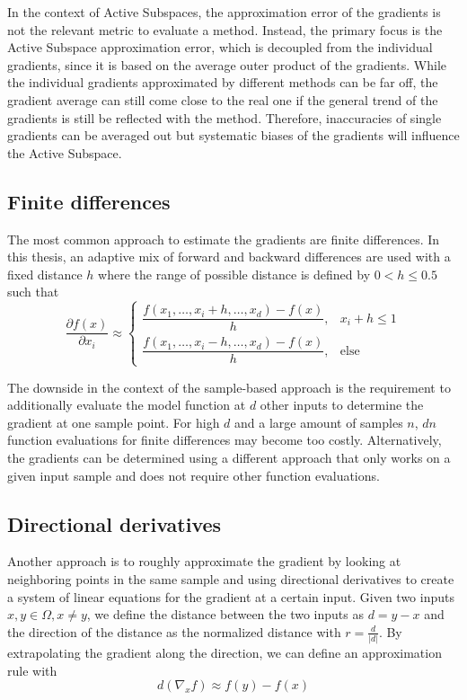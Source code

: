 \documentclass[
  a4paper,  %
  twoside,  %
  bibliography=totoc,
  headsepline,
  cleardoublepage=empty,
  parskip=half,
  draft=false
]{scrbook}
\begin{document}
In the context of Active Subspaces, the approximation error of the gradients is not the relevant metric to evaluate a method.
Instead, the primary focus is the Active Subspace approximation error, which is decoupled from the individual gradients, since it is based on the average outer product of the gradients.
While the individual gradients approximated by different methods can be far off, the gradient average can still come close to the real one if the general trend of the gradients is still be reflected with the method.
Therefore, inaccuracies of single gradients can be averaged out but systematic biases of the gradients will influence the Active Subspace.


\subsection{Finite differences}

The most common approach to estimate the gradients are finite differences.
In this thesis, an adaptive mix of forward and backward differences are used with a fixed distance $h$ where the range of possible distance is defined by $0 < h \leq 0.5$ such that
\begin{equation}
\frac{\partial f(x)}{\partial x_i} \approx
\begin{cases}
    \dfrac{f(x_1, \dots, x_i + h, \dots, x_d) - f(x)}{h}, & x_i + h \leq 1 \\[1.5em]
    \dfrac{f(x_1, \dots, x_i - h, \dots, x_d) - f(x)}{h}, & \text{else}
\end{cases}
\end{equation}

The downside in the context of the sample-based approach is the requirement to additionally evaluate the model function at $d$ other inputs to determine the gradient at one sample point.
For high $d$ and a large amount of samples $n$, $dn$ function evaluations for finite differences may become too costly.
Alternatively, the gradients can be determined using a different approach that only works on a given input sample and does not require other function evaluations.

\subsection{Directional derivatives}

Another approach is to roughly approximate the gradient by looking at neighboring points in the same sample and using directional derivatives to create a system of linear equations for the gradient at a certain input.
Given two inputs $x, y \in \Omega, x \neq y$, we define the distance between the two inputs as $d=y-x$ and the direction of the distance as the normalized distance with $r=\frac{d}{|d|}$.
By extrapolating the gradient along the direction, we can define an approximation rule with
\begin{equation}
d (\nabla_x f) \approx f(y) - f(x)
\end{equation}
\end{document}
